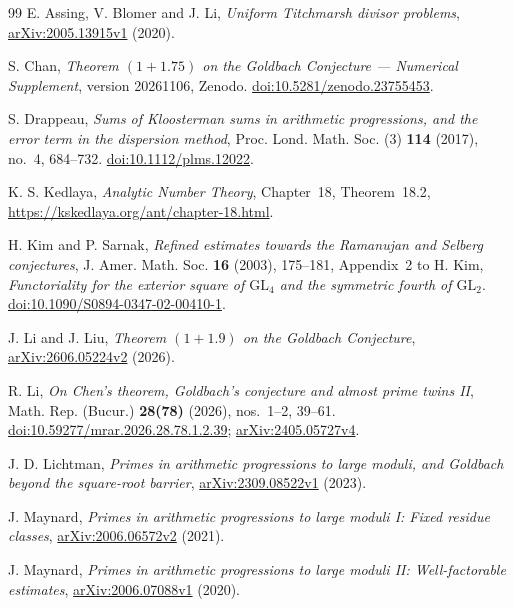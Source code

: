 \begin{thebibliography}{99}
E. Assing, V. Blomer and J. Li,
\emph{Uniform Titchmarsh divisor problems},
\href{https://arxiv.org/abs/2005.13915v1}{arXiv:2005.13915v1} (2020).

S. Chan,
\emph{Theorem $(1+1.75)$ on the Goldbach Conjecture --- Numerical Supplement},
version 20261106, Zenodo.
\href{https://doi.org/10.5281/zenodo.23755453}{doi:10.5281/zenodo.23755453}.

S. Drappeau,
\emph{Sums of Kloosterman sums in arithmetic progressions, and the error
term in the dispersion method}, Proc. Lond. Math. Soc. (3)
\textbf{114} (2017), no.~4, 684--732.
\href{https://doi.org/10.1112/plms.12022}{doi:10.1112/plms.12022}.

K. S. Kedlaya,
\emph{Analytic Number Theory}, Chapter~18, Theorem~18.2,
\url{https://kskedlaya.org/ant/chapter-18.html}.

H. Kim and P. Sarnak,
\emph{Refined estimates towards the Ramanujan and Selberg conjectures},
J. Amer. Math. Soc. \textbf{16} (2003), 175--181,
Appendix~2 to H. Kim, \emph{Functoriality for the exterior square of
$\mathrm{GL}_4$ and the symmetric fourth of $\mathrm{GL}_2$}.
\href{https://doi.org/10.1090/S0894-0347-02-00410-1}{doi:10.1090/S0894-0347-02-00410-1}.

J. Li and J. Liu,
\emph{Theorem $(1+1.9)$ on the Goldbach Conjecture},
\href{https://arxiv.org/abs/2606.05224v2}{arXiv:2606.05224v2} (2026).

R. Li,
\emph{On Chen's theorem, Goldbach's conjecture and almost prime twins II},
Math. Rep. (Bucur.) \textbf{28(78)} (2026), nos.~1--2, 39--61.
\href{https://doi.org/10.59277/mrar.2026.28.78.1.2.39}{doi:10.59277/mrar.2026.28.78.1.2.39};
\href{https://arxiv.org/abs/2405.05727v4}{arXiv:2405.05727v4}.

J. D. Lichtman,
\emph{Primes in arithmetic progressions to large moduli, and Goldbach
beyond the square-root barrier},
\href{https://arxiv.org/abs/2309.08522v1}{arXiv:2309.08522v1} (2023).

J. Maynard,
\emph{Primes in arithmetic progressions to large moduli I: Fixed residue
classes},
\href{https://arxiv.org/abs/2006.06572v2}{arXiv:2006.06572v2} (2021).

J. Maynard,
\emph{Primes in arithmetic progressions to large moduli II: Well-factorable
estimates},
\href{https://arxiv.org/abs/2006.07088v1}{arXiv:2006.07088v1} (2020).


\end{thebibliography}
